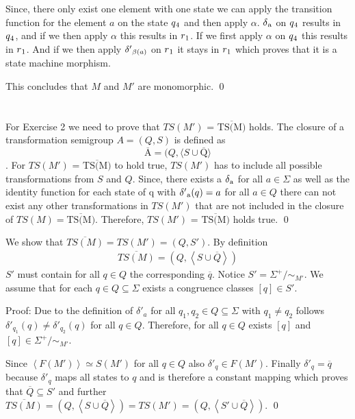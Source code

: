 \documentclass[a4paper,12pt,numbers=noenddot]{scrreport}
\def\lsk{\left<}
\def\rsk{\right>}
\begin{document}
Since, there only exist one element with one state we can apply the transition function for the element $a$ on the state $q\textsubscript{4}$ and then apply $\alpha$. $\delta\textsubscript{a}$ on $q\textsubscript{4}$ results in $q\textsubscript{4}$, and if we then apply $\alpha$ this results in $r\textsubscript{1}$. If we first apply $\alpha$ on $q\textsubscript{4}$ this results in $r\textsubscript{1}$. And if we then apply $\delta'\textsubscript{$\beta(a)$}$ on $r\textsubscript{1}$ it stays in $r\textsubscript{1}$ which proves that it is a state machine morphism. 

This concludes that $M$ and $M'$ are monomorphic.
\qed

\section{}

For Exercise 2 we need to prove that $TS(M')$ = $\overline{\mbox{TS(M)}}$ holds. The closure of a transformation semigroup $A = (Q, S)$ is defined as 
\begin{equation}
    \overline{\mbox{A}} = (Q, \langle S \cup \overline{\mbox{Q}} \rangle
\end{equation}
.
For $TS(M')$ = $\overline{\mbox{TS(M)}}$ to hold true, $TS(M')$ has to include all possible transformations from $S$ and $Q$. Since, there exists a $\delta\textsubscript{a}$ for all $a \in \Sigma$ as well as the identity function for each state of q with $\delta'\textsubscript{a}(q) = a$ for all $a \in Q$ there can not exist any other transformations in $TS(M')$ that are not included in the closure of $TS(M) = \overline{\mbox{TS(M)}}$. Therefore, $TS(M')$ = $\overline{\mbox{TS(M)}}$ holds true.
\qed

We show that $\overline{TS(M)}=TS(M')=(Q,S')$. By definition
\begin{align*}
    \overline{TS(M)}=(Q,\lsk S \cup \overline{Q} \rsk)
\end{align*}
$S'$ must contain for all $q \in Q$ the corresponding $\overline{q}$.
Notice $S'= \Sigma^+/\sim_{M'}$.
We assume that for each $q \in Q \subseteq \Sigma$ exists a congruence classes $[q] \in S'$.

Proof:
Due to the definition of $\delta'_a$ for all $q_1,q_2 \in Q \subseteq \Sigma$ with $q_1 \neq q_2$ follows $\delta'_{q_1}(q) \neq \delta'_{q_2}(q)$ for all $q \in Q$.
Therefore, for all $q \in Q$ exists $[q]$ and $[q] \in \Sigma^+/\sim_{M'}$.

Since $\lsk F(M') \rsk \simeq S(M')$ for all $q \in Q$ also $\delta'_q \in F(M')$.
Finally $\delta'_q = \overline{q}$ because $\delta'_q$ maps all states to $q$ and is therefore a constant mapping which proves that $\overline{Q} \subseteq S'$ and further $\overline{TS(M)}=(Q,\lsk S \cup \overline{Q} \rsk)=TS(M')=(Q,\lsk S' \cup \overline{Q} \rsk)$.
\qed
\section{}
\section{}
\end{document}
